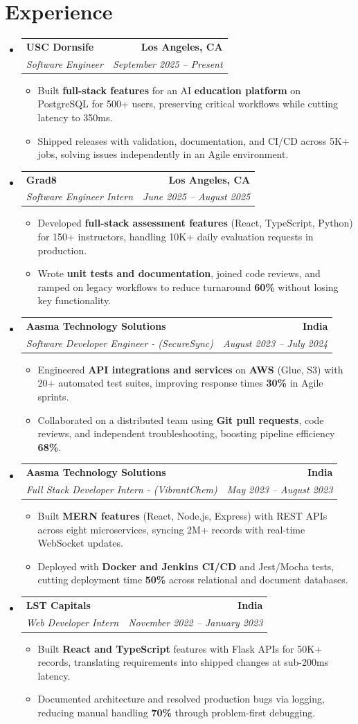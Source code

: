 \documentclass[letterpaper,10pt]{article}
\makeatletter
\newcommand{\resumeItem}[1]{\item\small{{#1 \vspace{-2pt}}}}
\newcommand{\resumeSubheading}[4]{\vspace{-1pt}\item\begin{tabular*}{1.0\textwidth}[t]{l@{\extracolsep{\fill}}r}\textbf{#1} & \textbf{\small #2} \\\textit{\small#3} & \textit{\small #4} \\\end{tabular*}\vspace{-2pt}}
\newcommand{\resumeSubHeadingListStart}{\begin{itemize}[leftmargin=0.0in, label={}]}
\newcommand{\resumeSubHeadingListEnd}{\end{itemize}}
\newcommand{\resumeItemListStart}{\begin{itemize}[leftmargin=0.15in,label=\textbullet,itemsep=2pt,topsep=0pt,parsep=0pt,partopsep=0pt]}
\newcommand{\resumeItemListEnd}{\end{itemize}\vspace{-4pt}}
\makeatother
\begin{document}
\section{Experience}
\resumeSubHeadingListStart
\resumeSubheading{USC Dornsife}{Los Angeles, CA}{Software Engineer}{September 2025 -- Present}
\resumeItemListStart
\resumeItem{Built \textbf{full-stack features} for an AI \textbf{education platform} on PostgreSQL for 500+ users, preserving critical workflows while cutting latency to 350ms.}
\resumeItem{Shipped releases with validation, documentation, and CI/CD across 5K+ jobs, solving issues independently in an Agile environment.}
\resumeItemListEnd
\resumeSubheading{Grad8}{Los Angeles, CA}{Software Engineer Intern}{June 2025 -- August 2025}
\resumeItemListStart
\resumeItem{Developed \textbf{full-stack assessment features} (React, TypeScript, Python) for 150+ instructors, handling 10K+ daily evaluation requests in production.}
\resumeItem{Wrote \textbf{unit tests and documentation}, joined code reviews, and ramped on legacy workflows to reduce turnaround \textbf{60\%} without losing key functionality.}
\resumeItemListEnd
\resumeSubheading{Aasma Technology Solutions}{India}{Software Developer Engineer - (SecureSync)}{August 2023 -- July 2024}
\resumeItemListStart
\resumeItem{Engineered \textbf{API integrations and services} on \textbf{AWS} (Glue, S3) with 20+ automated test suites, improving response times \textbf{30\%} in Agile sprints.}
\resumeItem{Collaborated on a distributed team using \textbf{Git pull requests}, code reviews, and independent troubleshooting, boosting pipeline efficiency \textbf{68\%}.}
\resumeItemListEnd
\resumeSubheading{Aasma Technology Solutions}{India}{Full Stack Developer Intern - (VibrantChem)}{May 2023 -- August 2023}
\resumeItemListStart
\resumeItem{Built \textbf{MERN features} (React, Node.js, Express) with REST APIs across eight microservices, syncing 2M+ records with real-time WebSocket updates.}
\resumeItem{Deployed with \textbf{Docker and Jenkins CI/CD} and Jest/Mocha tests, cutting deployment time \textbf{50\%} across relational and document databases.}
\resumeItemListEnd
\resumeSubheading{LST Capitals}{India}{Web Developer Intern}{November 2022 -- January 2023}
\resumeItemListStart
\resumeItem{Built \textbf{React and TypeScript} features with Flask APIs for 50K+ records, translating requirements into shipped changes at sub-200ms latency.}
\resumeItem{Documented architecture and resolved production bugs via logging, reducing manual handling \textbf{70\%} through problem-first debugging.}
\resumeItemListEnd
\resumeSubHeadingListEnd
\vspace{-6pt}
\end{document}
